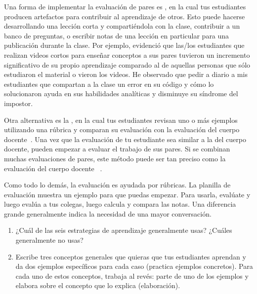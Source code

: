 Una forma de implementar la evaluación de pares es ,
en la cual tus estudiantes producen artefactos para contribuir al aprendizaje de otros.
Esto puede hacerse desarrollando una lección corta y compartiéndola con la clase,
contribuir a un banco de preguntas,
o escribir notas de una lección en particular para una publicación durante la clase.
Por ejemplo,
\cite{Fran2018} evidenció que las/los estudiantes que realizan videos cortos para enseñar conceptos a sus pares
tuvieron un incremento significativo de su propio aprendizaje
comparado al de aquellas personas que sólo estudiaron el material o vieron los videos.
He observado que pedir a diario a mis estudiantes que compartan a la clase un error en su código y cómo lo solucionaron ayuda en sus habilidades analíticas y disminuye su síndrome del impostor.

Otra alternativa es la ,
en la cual tus estudiantes revisan uno o más ejemplos utilizando una rúbrica
y comparan su evaluación con la evaluación del cuerpo docente~\cite{Kulk2013}.
Una vez que la evaluación de tu estudiante sea similar a la del cuerpo docente,
pueden empezar a evaluar el trabajo de sus pares.
Si se combinan muchas evaluaciones de pares,
este método puede ser tan preciso como la evaluación del cuerpo docente ~\cite{Pare2008}.

Como todo lo demás,
la evaluación es ayudada por rúbricas.
La planilla de evaluación  muestra un ejemplo para que puedas empezar.
Para usarla,
evalúate y luego evalúa a tus colegas,
luego calcula y compara las notas.
Una diferencia grande generalmente indica la necesidad de una mayor conversación.



\begin{enumerate}

\item
  ¿Cuál de las seis estrategias de aprendizaje generalmente usas?
  ¿Cuáles generalmente no usas?

\item
  Escribe tres conceptos generales que quieras que tus estudiantes aprendan
  y da dos ejemplos específicos para cada caso
  (practica ejemplos concretos).
  Para cada uno de estos conceptos,
  trabaja al revés: parte de uno de los ejemplos y elabora sobre el concepto que lo explica
  (elaboración).

\end{enumerate}


